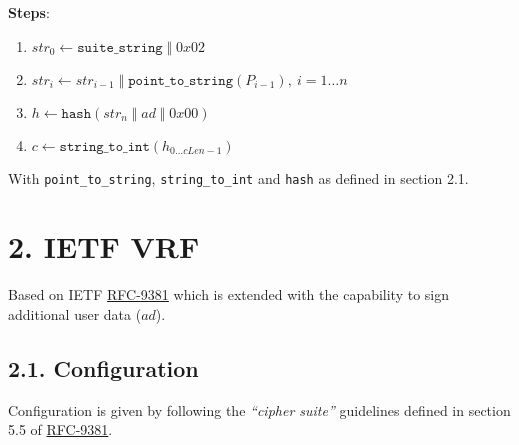 \documentclass[
]{article}
\providecommand{\tightlist}{%
  \setlength{\itemsep}{0pt}\setlength{\parskip}{0pt}}
\begin{document}
\textbf{Steps}:

\begin{enumerate}
\def\labelenumi{\arabic{enumi}.}
\tightlist
\item
  \(str_0 \gets \texttt{suite\_string}\;\Vert\;0x02\)
\item
  \(str_i \gets str_{i-1}\;\Vert\;\texttt{point\_to\_string}(P_{i-1}),\ i = 1 \dots n\)
\item
  \(h \gets \texttt{hash}(str_n\;\Vert\;ad\;\Vert\;0x00)\)
\item
  \(c \gets \texttt{string\_to\_int}(h_{0 \dots cLen - 1})\)
\end{enumerate}

With \texttt{point\_to\_string}, \texttt{string\_to\_int} and
\texttt{hash} as defined in section 2.1.

\section{2. IETF VRF}\label{ietf-vrf}

Based on IETF \href{https://datatracker.ietf.org/doc/rfc9381}{RFC-9381}
which is extended with the capability to sign additional user data
(\(ad\)).

\subsection{2.1. Configuration}\label{configuration}

Configuration is given by following the \emph{``cipher suite''}
guidelines defined in section 5.5 of
\href{https://datatracker.ietf.org/doc/rfc9381}{RFC-9381}.
\end{document}
